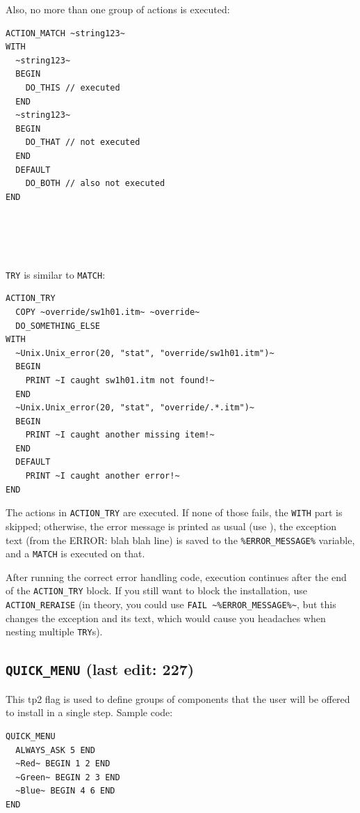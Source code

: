 \documentclass{article}
\def\ttref#1{\ahrefloc{#1}{\tt #1}}
\def\t#1{{\tt #1}}
\begin{document}
Also, no more than one group of actions is executed:
\begin{verbatim}
ACTION_MATCH ~string123~
WITH
  ~string123~
  BEGIN
    DO_THIS // executed
  END
  ~string123~
  BEGIN
    DO_THAT // not executed
  END
  DEFAULT
    DO_BOTH // also not executed
END
\end{verbatim}
\\
\\
\\
\\
\verb+TRY+ is similar to \verb+MATCH+:
\begin{verbatim}
ACTION_TRY
  COPY ~override/sw1h01.itm~ ~override~
  DO_SOMETHING_ELSE
WITH
  ~Unix.Unix_error(20, "stat", "override/sw1h01.itm")~
  BEGIN
    PRINT ~I caught sw1h01.itm not found!~
  END
  ~Unix.Unix_error(20, "stat", "override/.*.itm")~
  BEGIN
    PRINT ~I caught another missing item!~
  END
  DEFAULT
    PRINT ~I caught another error!~
END
\end{verbatim}

The actions in \verb+ACTION_TRY+ are executed. If none of those fails, the
\verb+WITH+ part is skipped; otherwise, the error message is printed as usual
(use \ttref{SILENT}), the exception text (from the ERROR: blah blah line) is
saved to the \verb+%ERROR_MESSAGE%+ variable, and a \verb+MATCH+ is executed
on that.

After running the correct error handling code, execution continues after the
end of the \verb+ACTION_TRY+ block. If you still want to block the
installation, use \verb+ACTION_RERAISE+ (in theory, you could use
\verb+FAIL ~%ERROR_MESSAGE%~+, but this changes the exception and its text,
which would cause you headaches when nesting multiple \verb+TRY+s).



\label{sec-quick-menu}\subsection{\t{QUICK_MENU} (last edit: 227)}

This tp2 flag is used to define groups of components that the user will be
offered to install in a single step. Sample code:

\begin{verbatim}
QUICK_MENU
  ALWAYS_ASK 5 END
  ~Red~ BEGIN 1 2 END
  ~Green~ BEGIN 2 3 END
  ~Blue~ BEGIN 4 6 END
END
\end{verbatim}
\end{document}
